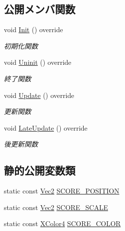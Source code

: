 \subsection*{公開メンバ関数}
\begin{DoxyCompactItemize}
\item 
void \mbox{\hyperlink{class_score_update_afd51e11ad00ebc15d9b3139398437afc}{Init}} () override
\begin{DoxyCompactList}\small\item\em 初期化関数 \end{DoxyCompactList}\item 
void \mbox{\hyperlink{class_score_update_a701d9c84c3ef92b1c54f33b37e23605f}{Uninit}} () override
\begin{DoxyCompactList}\small\item\em 終了関数 \end{DoxyCompactList}\item 
void \mbox{\hyperlink{class_score_update_aae2b398784079a651ed92eb4c634b1c9}{Update}} () override
\begin{DoxyCompactList}\small\item\em 更新関数 \end{DoxyCompactList}\item 
void \mbox{\hyperlink{class_score_update_adc9a48f54828e49c072c298777935893}{Late\+Update}} () override
\begin{DoxyCompactList}\small\item\em 後更新関数 \end{DoxyCompactList}\end{DoxyCompactItemize}
\subsection*{静的公開変数類}
\begin{DoxyCompactItemize}
\item 
static const \mbox{\hyperlink{_vector3_d_8h_a5ef6e95dfc5f9d3820b71772d99bbc25}{Vec2}} \mbox{\hyperlink{class_score_update_a88bd91fc66dd629a849ab9f0a178150c}{S\+C\+O\+R\+E\+\_\+\+P\+O\+S\+I\+T\+I\+ON}}
\item 
static const \mbox{\hyperlink{_vector3_d_8h_a5ef6e95dfc5f9d3820b71772d99bbc25}{Vec2}} \mbox{\hyperlink{class_score_update_a23e9b8c4c6624cf5f3b66258771b3243}{S\+C\+O\+R\+E\+\_\+\+S\+C\+A\+LE}}
\item 
static const \mbox{\hyperlink{_vector3_d_8h_a680c30c4a07d86fe763c7e01169cd6cc}{X\+Color4}} \mbox{\hyperlink{class_score_update_ab78fc9ad68faf9f5be01096b5d60959e}{S\+C\+O\+R\+E\+\_\+\+C\+O\+L\+OR}}
\end{DoxyCompactItemize}


